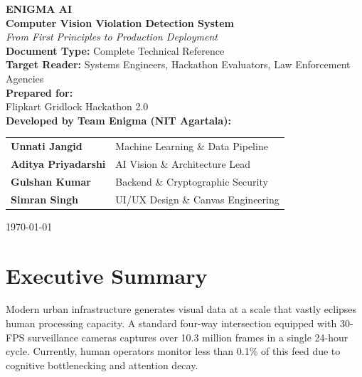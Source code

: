 \documentclass[12pt,a4paper]{article}
\begin{document}
\begin{titlepage}
    \centering
    \vspace*{2cm}
    
    {\Huge \textbf{\textsf{ENIGMA AI}}}\\[1cm]
    {\LARGE \textbf{Computer Vision Violation Detection System}}\\[0.5cm]
    {\Large \textit{From First Principles to Production Deployment}}\\[2cm]
    
    \textbf{Document Type:} Complete Technical Reference\\
    \textbf{Target Reader:} Systems Engineers, Hackathon Evaluators, Law Enforcement Agencies\\[2cm]
    
    \textbf{Prepared for:}\\
    {\Large Flipkart Gridlock Hackathon 2.0}\\[2cm]
    
    \textbf{Developed by Team Enigma (NIT Agartala):}\\
    \vspace{0.5cm}
    \begin{tabular}{ll}
        \textbf{Unnati Jangid} & Machine Learning \& Data Pipeline \\
        \textbf{Aditya Priyadarshi} & AI Vision \& Architecture Lead \\
        \textbf{Gulshan Kumar} & Backend \& Cryptographic Security \\
        \textbf{Simran Singh} & UI/UX Design \& Canvas Engineering \\
    \end{tabular}
    
    \vfill
    {\large \today}\\[1cm]
\end{titlepage}

\newpage
\tableofcontents
\newpage

\section{Executive Summary}
\indent Modern urban infrastructure generates visual data at a scale that vastly eclipses human processing capacity. A standard four-way intersection equipped with 30-FPS surveillance cameras captures over 10.3 million frames in a single 24-hour cycle. Currently, human operators monitor less than 0.1\% of this feed due to cognitive bottlenecking and attention decay. 
\end{document}
